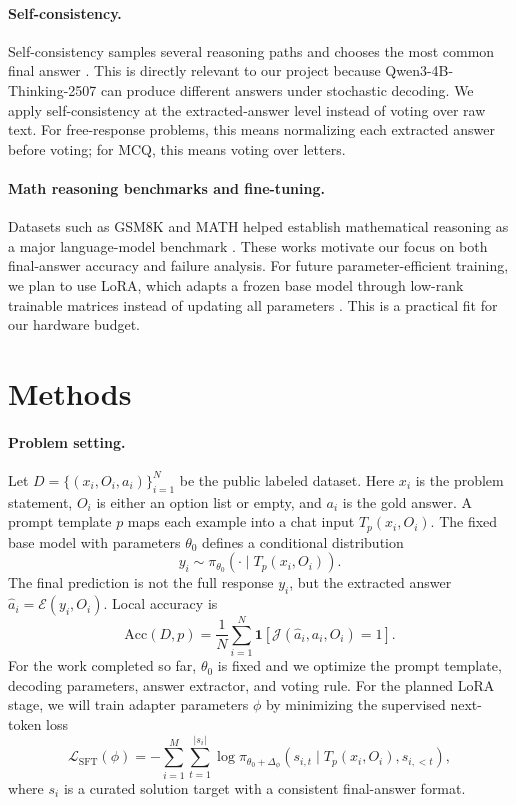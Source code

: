 \documentclass{article}
\newcommand{\model}{Qwen3-4B-Thinking-2507}
\newcommand{\answerextract}{\mathcal{E}}
\newcommand{\scorefn}{\mathcal{J}}
\begin{document}
\paragraph{Self-consistency.}
Self-consistency samples several reasoning paths and chooses the most common final answer \citep{wang2023selfconsistency}. This is directly relevant to our project because \model{} can produce different answers under stochastic decoding. We apply self-consistency at the extracted-answer level instead of voting over raw text. For free-response problems, this means normalizing each extracted answer before voting; for MCQ, this means voting over letters.

\paragraph{Math reasoning benchmarks and fine-tuning.}
Datasets such as GSM8K and MATH helped establish mathematical reasoning as a major language-model benchmark \citep{cobbe2021training,hendrycks2021measuring}. These works motivate our focus on both final-answer accuracy and failure analysis. For future parameter-efficient training, we plan to use LoRA, which adapts a frozen base model through low-rank trainable matrices instead of updating all parameters \citep{hu2022lora}. This is a practical fit for our hardware budget.

\section{Methods}
\label{sec:methods}

\paragraph{Problem setting.}
Let $D = \{(x_i, O_i, a_i)\}_{i=1}^{N}$ be the public labeled dataset. Here $x_i$ is the problem statement, $O_i$ is either an option list or empty, and $a_i$ is the gold answer. A prompt template $p$ maps each example into a chat input $T_p(x_i, O_i)$. The fixed base model with parameters $\theta_0$ defines a conditional distribution
\begin{equation}
  y_i \sim \pi_{\theta_0}(\cdot \mid T_p(x_i, O_i)).
\end{equation}
The final prediction is not the full response $y_i$, but the extracted answer $\hat{a}_i = \answerextract(y_i, O_i)$. Local accuracy is
\begin{equation}
  \mathrm{Acc}(D,p) =
  \frac{1}{N}\sum_{i=1}^{N}
  \mathbf{1}\left[\scorefn(\hat{a}_i, a_i, O_i)=1\right].
\end{equation}
For the work completed so far, $\theta_0$ is fixed and we optimize the prompt template, decoding parameters, answer extractor, and voting rule. For the planned LoRA stage, we will train adapter parameters $\phi$ by minimizing the supervised next-token loss
\begin{equation}
  \mathcal{L}_{\mathrm{SFT}}(\phi) =
  -\sum_{i=1}^{M}\sum_{t=1}^{|s_i|}
  \log \pi_{\theta_0+\Delta_{\phi}}
  \left(s_{i,t}\mid T_p(x_i,O_i), s_{i,<t}\right),
\end{equation}
where $s_i$ is a curated solution target with a consistent final-answer format.
\end{document}
